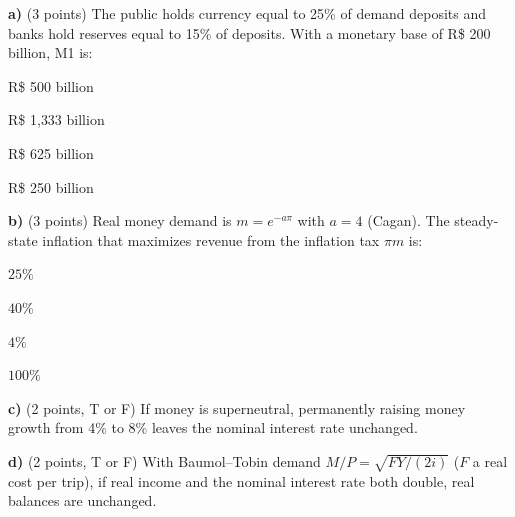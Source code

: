 \documentclass[11pt,a4paper]{article}
\begin{document}


\textbf{a)} (3 points) The public holds currency equal to 25\% of demand deposits and banks
hold reserves equal to 15\% of deposits. With a monetary base of R\$ 200 billion, M1 is:
\begin{alternativas}
\item R\$ 500 billion
\item R\$ 1{,}333 billion
\item R\$ 625 billion
\item R\$ 250 billion
\end{alternativas}
\begin{sol}
\end{sol}

\medskip
\textbf{b)} (3 points) Real money demand is $m=e^{-a\pi}$ with $a=4$ (Cagan). The steady-state
inflation that maximizes revenue from the inflation tax $\pi m$ is:
\begin{alternativas}
\item $25\%$
\item $40\%$
\item $4\%$
\item $100\%$
\end{alternativas}
\begin{sol}
\end{sol}

\medskip
\textbf{c)} (2 points, T or F) If money is superneutral, permanently raising money growth from
4\% to 8\% leaves the nominal interest rate unchanged.
\begin{sol}
\end{sol}

\medskip
\textbf{d)} (2 points, T or F) With Baumol--Tobin demand $M/P=\sqrt{FY/(2i)}$ ($F$ a real cost
per trip), if real income and the nominal interest rate both double, real balances are unchanged.
\begin{sol}
\end{sol}
\end{document}
